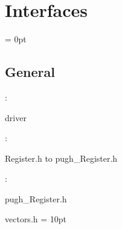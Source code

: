 
\section{Interfaces} 


\parskip = 0pt

\vspace{3mm} \subsection*{General}

: 

driver
\vspace{2mm}

\vspace{5mm}

: 



Register.h to pugh\_Register.h
\vspace{2mm}

: 

pugh\_Register.h

vectors.h
\vspace{2mm}\parskip = 10pt 
